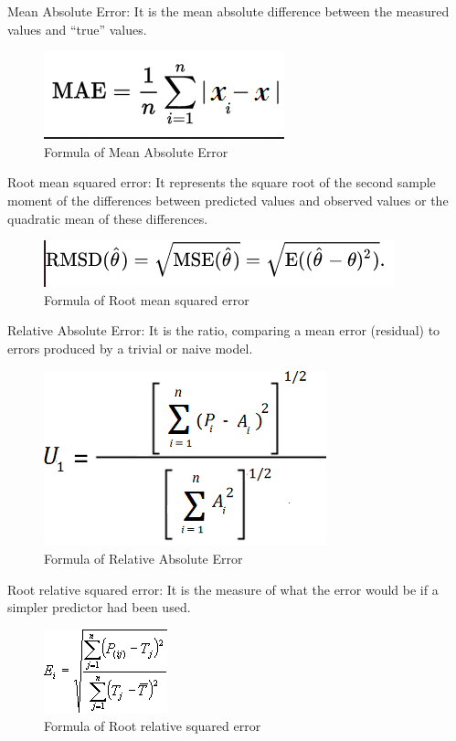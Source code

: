 \documentclass[runningheads]{llncs}
\begin{document}
Mean Absolute Error\cite{abs}: It is the mean absolute difference between the measured values and “true” values.
\begin{figure}[H]
    \caption{Formula of Mean Absolute Error}\label{MAE}
    \centerline{\includegraphics[scale=0.5]{imagens/MAE.png}}
\end{figure}
Root mean squared error\cite{rmse}: It represents the square root of the second sample moment of the differences between predicted values and observed values or the quadratic mean of these differences.
\begin{figure}[H]
    \caption{Formula of Root mean squared error}\label{RMSE}
    \centerline{\includegraphics[scale=0.5]{imagens/RMSD.png}}
\end{figure}
Relative Absolute Error\cite{rae}: It is the ratio, comparing a mean error (residual) to errors produced by a trivial or naive model.
\begin{figure}[H]
    \caption{Formula of Relative Absolute Error}\label{RAE}
    \centerline{\includegraphics[scale=0.5]{imagens/RAE.png}}
\end{figure}
Root relative squared error\cite{rrse}: It is the measure of what the error would be if a simpler predictor had been used.
\begin{figure}[H]
    \caption{Formula of Root relative squared error}\label{RRSE}
    \centerline{\includegraphics[scale=0.5]{imagens/RRSE.png}}
\end{figure}
\end{document}
